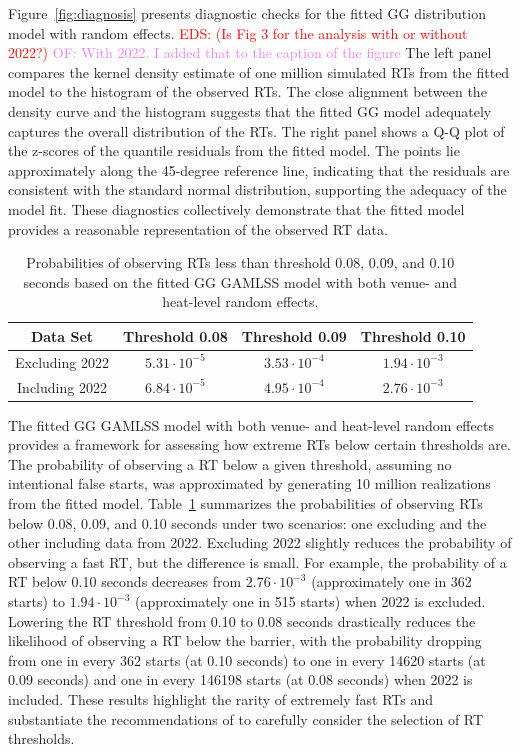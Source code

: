 \documentclass[12pt, letterpaper]{article}
\newcommand{\eds}[1]{\textcolor{red}{EDS: (#1)}}
\newcommand{\of}[1]{\textcolor{violet}{OF: #1}}
\begin{document}
Figure~\ref{fig:diagnosis} presents diagnostic checks for the fitted
GG distribution model with random effects. \eds{Is Fig 3 for the analysis with 
or without 2022?}
\of{With 2022. I added that to the caption of the figure} The left
panel compares the kernel density estimate of one million simulated RTs
from the fitted model to the histogram of the observed RTs.
The close alignment between the density curve and the histogram suggests that
the fitted GG model adequately captures the overall distribution of the
RTs. The right panel shows a Q-Q plot of the z-scores of the
quantile residuals from the fitted model. The points lie approximately along
the 45-degree reference line, indicating that the residuals are consistent
with the standard normal distribution, supporting the adequacy of the model
fit. These diagnostics collectively demonstrate that the fitted model provides
a reasonable representation of the observed RT data.


\begin{table}
  \centering
  \caption{Probabilities of observing RTs less than threshold 0.08,
  0.09, and 0.10 seconds based on the
    fitted GG GAMLSS model with both venue- and heat-level
random effects.}
  \begin{tabular}{c c c c}
   \toprule
   Data Set & Threshold 0.08 & Threshold 0.09 & Threshold 0.10  \\
   \midrule
   Excluding 2022 & $5.31\cdot10^{-5}$ & $3.53\cdot10^{-4}$ &  $1.94\cdot10^{-3}$  \\
   Including 2022 & $6.84\cdot10^{-5}$ & $4.95\cdot10^{-4}$ & $2.76\cdot10^{-3}$ \\
   \bottomrule
  \end{tabular}
  \label{tab:Sim_probability}
\end{table}


The fitted GG GAMLSS model with both venue- and heat-level
random effects provides a framework for assessing how extreme RTs
below certain thresholds are. The probability of observing a RT
below a given threshold, assuming no intentional false starts, was approximated
by generating 10 million realizations from the fitted model.
Table~\ref{tab:Sim_probability} summarizes the probabilities of observing
RTs below 0.08, 0.09, and 0.10 seconds under two scenarios: one
excluding and the other including data from 2022. Excluding 2022 slightly
reduces the probability of observing a fast RT, but the difference
is small. For example, the probability of a RT below 0.10 seconds
decreases from $2.76 \cdot 10^{-3}$ (approximately one in 362 starts) to
$1.94 \cdot 10^{-3}$ (approximately one in 515 starts) when 2022 is excluded.
Lowering the RT threshold from 0.10 to 0.08 seconds drastically
reduces the likelihood of observing a RT below the barrier, with
the probability dropping from one in every 362 starts (at 0.10 seconds) to one
in every 14620 starts (at 0.09 seconds) and one in every 146198 starts (at 0.08
seconds) when 2022 is included. These results highlight the rarity of extremely
fast RTs and substantiate the recommendations of \citet{komi2009iaaf}
to carefully consider the selection of RT thresholds.
\end{document}
